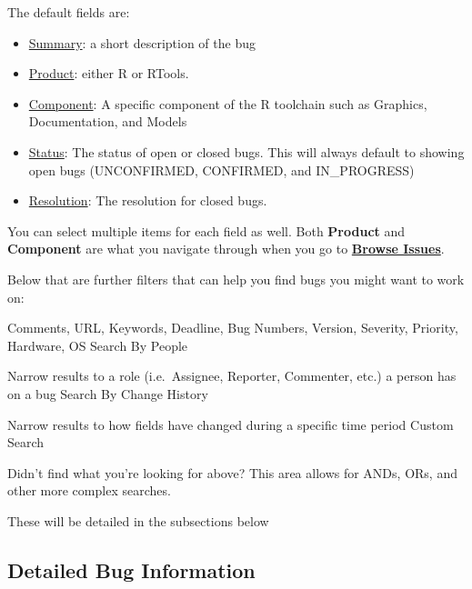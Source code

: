 \documentclass[
]{book}
\providecommand{\tightlist}{%
  \setlength{\itemsep}{0pt}\setlength{\parskip}{0pt}}
\begin{document}
The default fields are:

\begin{itemize}
\tightlist
\item
  \href{https://bugs.r-project.org/page.cgi?id=fields.html\#short_desc}{Summary}: a short description of the bug
\item
  \href{https://bugs.r-project.org/page.cgi?id=fields.html\#product}{Product}: either R or RTools.
\item
  \href{https://bugs.r-project.org/page.cgi?id=fields.html\#component}{Component}: A specific component of the R toolchain such as Graphics, Documentation, and Models
\item
  \href{https://bugs.r-project.org/page.cgi?id=fields.html\#bug_status}{Status}: The status of open or closed bugs. This will always default to showing open bugs (UNCONFIRMED, CONFIRMED, and IN\_PROGRESS)
\item
  \href{https://bugs.r-project.org/page.cgi?id=fields.html\#resolution}{Resolution}: The resolution for closed bugs.
\end{itemize}

You can select multiple items for each field as well.
Both \textbf{Product} and \textbf{Component} are what you navigate through when you go to \href{https://bugs.r-project.org/describecomponents.cgi}{\textbf{Browse Issues}}.

Below that are further filters that can help you find bugs you might want to work on:

\begin{description}
\tightlist
\item[Detailed Bug Information: Narrow results by the following fields]
Comments, URL, Keywords, Deadline, Bug Numbers, Version, Severity, Priority, Hardware, OS
Search By People

Narrow results to a role (i.e.~Assignee, Reporter, Commenter, etc.) a person has on a bug
Search By Change History

Narrow results to how fields have changed during a specific time period
Custom Search

Didn't find what you're looking for above? This area allows for ANDs, ORs, and other more complex searches.
\end{description}

These will be detailed in the subsections below

\subsection{Detailed Bug Information}\label{searching-dbi}
\end{document}
